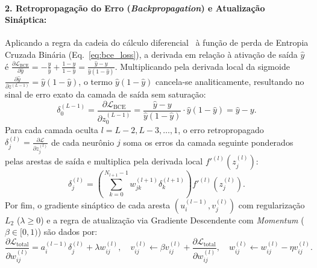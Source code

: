 \documentclass[runningheads]{llncs}
\begin{document}
\paragraph{2. Retropropaga\c{c}\~{a}o do Erro (\textit{Backpropagation}) e Atualiza\c{c}\~{a}o Sin\'{a}ptica:}
Aplicando a regra da cadeia do c\'{a}lculo diferencial~\cite{rumelhart1986learning} \`{a} fun\c{c}\~{a}o de perda de Entropia Cruzada Bin\'{a}ria (Eq.~\eqref{eq:bce_loss}), a derivada em rela\c{c}\~{a}o \`{a} ativa\c{c}\~{a}o de sa\'{i}da $\hat{y}$ \'{e} $\frac{\partial \mathcal{L}_{\text{BCE}}}{\partial \hat{y}} = -\frac{y}{\hat{y}} + \frac{1-y}{1-\hat{y}} = \frac{\hat{y}-y}{\hat{y}(1-\hat{y})}$. Multiplicando pela derivada local da sigmoide $\frac{\partial \hat{y}}{\partial z^{(L-1)}} = \hat{y}(1-\hat{y})$, o termo $\hat{y}(1-\hat{y})$ cancela-se analiticamente, resultando no sinal de erro exato da camada de sa\'{i}da sem satura\c{c}\~{a}o:
\begin{equation}
    \delta_0^{(L-1)} = \frac{\partial \mathcal{L}_{\text{BCE}}}{\partial z_0^{(L-1)}} = \frac{\hat{y} - y}{\hat{y}(1 - \hat{y})} \cdot \hat{y}(1 - \hat{y}) = \hat{y} - y.
    \label{eq:delta_out_bce}
\end{equation}
Para cada camada oculta $l = L-2, L-3, \dots, 1$, o erro retropropagado $\delta_j^{(l)} = \frac{\partial \mathcal{L}}{\partial z_j^{(l)}}$ de cada neur\^{o}nio $j$ soma os erros da camada seguinte ponderados pelas arestas de sa\'{i}da e multiplica pela derivada local $f'^{(l)}(z_j^{(l)})$:
\begin{equation}
    \delta_j^{(l)} = \left( \sum_{k=0}^{N_{l+1}-1} w_{jk}^{(l+1)} \delta_k^{(l+1)} \right) f'^{(l)}\!\left(z_j^{(l)}\right).
    \label{eq:delta_hidden}
\end{equation}
Por fim, o gradiente sin\'{a}ptico de cada aresta $(u_i^{(l-1)}, v_j^{(l)})$ com regulariza\c{c}\~{a}o $L_2$ ($\lambda \ge 0$) e a regra de atualiza\c{c}\~{a}o via Gradiente Descendente com \textit{Momentum} ($\beta \in [0, 1)$) s\~{a}o dados por:
\begin{equation}
    \frac{\partial \mathcal{L}_{\text{total}}}{\partial w_{ij}^{(l)}} = a_i^{(l-1)} \delta_j^{(l)} + \lambda w_{ij}^{(l)}, \quad v_{ij}^{(l)} \leftarrow \beta v_{ij}^{(l)} + \frac{\partial \mathcal{L}_{\text{total}}}{\partial w_{ij}^{(l)}}, \quad w_{ij}^{(l)} \leftarrow w_{ij}^{(l)} - \eta v_{ij}^{(l)}.
    \label{eq:weight_update}
\end{equation}
\end{document}
